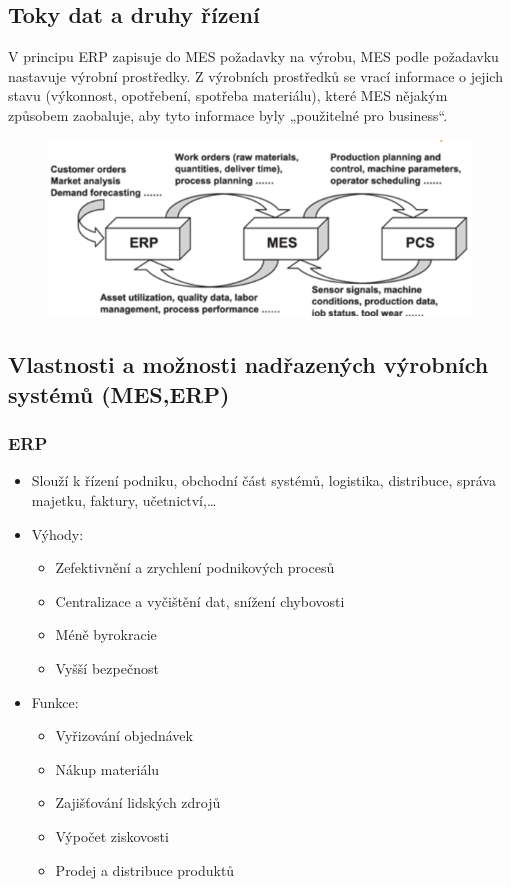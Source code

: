 \subsection{Toky dat a druhy řízení}
V principu ERP zapisuje do MES požadavky na výrobu, MES podle požadavku nastavuje výrobní prostředky. Z výrobních prostředků se vrací informace o jejich stavu (výkonnost, opotřebení, spotřeba materiálu), které MES nějakým způsobem zaobaluje, aby tyto informace byly „použitelné pro business“.

\begin{figure}[h]
    \begin{center}
        \includegraphics[scale = 1]{img/picture3.png}
    \end{center}
\end{figure}


\subsection{Vlastnosti a možnosti nadřazených výrobních systémů (MES,ERP)}
\subsubsection*{ERP}
\begin{itemize}
    \item Slouží k řízení podniku, obchodní část systémů, logistika, distribuce, správa majetku, faktury, učetnictví,\dots
    \item Výhody:\begin{itemize}
              \item Zefektivnění a zrychlení podnikových procesů
              \item Centralizace a vyčištění dat, snížení chybovosti
              \item Méně byrokracie
              \item Vyšší bezpečnost
          \end{itemize}
    \item Funkce: \begin{itemize}
              \item Vyřizování objednávek
              \item Nákup materiálu
              \item Zajišťování lidských zdrojů
              \item Výpočet ziskovosti
              \item Prodej a distribuce produktů
          \end{itemize}
\end{itemize}

